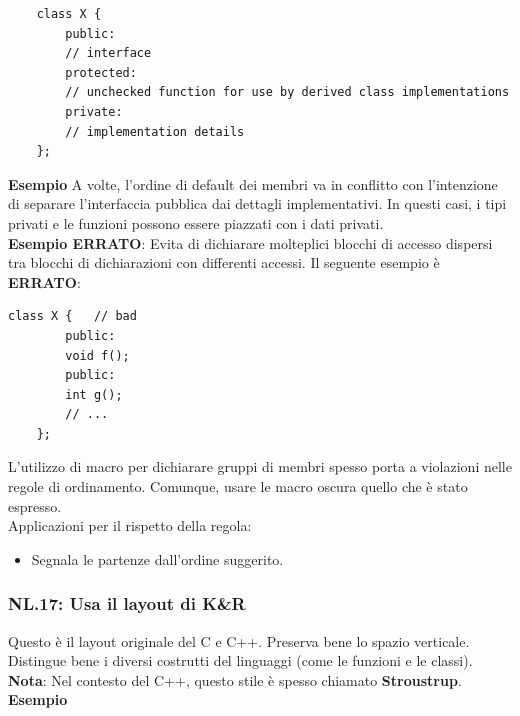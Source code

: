 \begin{lstlisting}
	class X {
		public:
		// interface
		protected:
		// unchecked function for use by derived class implementations
		private:
		// implementation details
	};
\end{lstlisting}

\textsf{\small \textbf{Esempio} A volte, l'ordine di default dei membri va in conflitto con l'intenzione di separare l'interfaccia pubblica dai dettagli implementativi. In questi casi, i tipi privati e le funzioni possono essere piazzati con i dati privati.} \\

\textsf{\small \textbf{Esempio ERRATO}: Evita di dichiarare molteplici blocchi di accesso dispersi tra blocchi di dichiarazioni con differenti accessi. Il seguente esempio è \textbf{\color{red}ERRATO}\normalcolor: } \\

\begin{lstlisting}[frame=single, rulecolor=\color{red}]
	class X {   // bad
		public:
		void f();
		public:
		int g();
		// ...
	};
\end{lstlisting}

\textsf{\small L'utilizzo di macro per dichiarare gruppi di membri spesso porta a violazioni nelle regole di ordinamento. Comunque, usare le macro oscura quello che è stato espresso. } \\

\textsf{\small Applicazioni per il rispetto della regola: } 

\begin{itemize}
	\item \textsf{\small Segnala le partenze dall'ordine suggerito.}
\end{itemize}

\subsubsection{NL.17: Usa il layout di K\&R }

\textsf{\small Questo è il layout originale del C e C++. Preserva bene lo spazio verticale. Distingue bene i diversi costrutti del linguaggi (come le funzioni e le classi).} \\

\textsf{\small \textbf{Nota}: Nel contesto del C++, questo stile è spesso chiamato \textbf{Stroustrup}.} \\

\textsf{\small \textbf{Esempio}}

